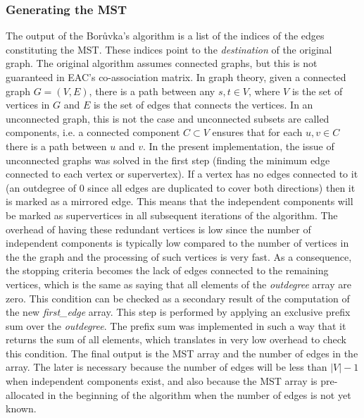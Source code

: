 \subsubsection{Generating the MST}
The output of the Borůvka's algorithm is a list of the indices of the edges constituting the MST. 
These indices point to the \emph{destination} of the original graph. 
The original algorithm \cite{Sousa2015} assumes connected graphs, but this is not guaranteed in EAC's co-association matrix.
In graph theory, given a connected graph $G = (V,E)$, there is a path between any $s,t \in V$, where $V$ is the set of vertices in $G$ and $E$ is the set of edges that connects the vertices.
In an unconnected graph, this is not the case and unconnected subsets are called components, i.e. a connected component $C \subset V$ ensures that for each $u,v \in C$ there is a path between $u$ and $v$.
In the present implementation, the issue of unconnected graphs was solved in the first step (finding the minimum edge connected to each vertex or supervertex). 
If a vertex has no edges connected to it (an outdegree of 0 since all edges are duplicated to cover both directions) then it is marked as a mirrored edge. 
This means that the independent components will be marked as supervertices in all subsequent iterations of the algorithm. 
The overhead of having these redundant vertices is low since the number of independent components is typically low compared to the number of vertices in the the graph and the processing of such vertices is very fast.
As a consequence, the stopping criteria becomes the lack of edges connected to the remaining vertices, which is the same as saying that all elements of the \emph{outdegree} array are zero. 
This condition can be checked as a secondary result of the computation of the new \emph{first\_edge} array. 
This step is performed by applying an exclusive prefix sum over the \emph{outdegree}. 
The prefix sum was implemented in such a way that it returns the sum of all elements, which translates in very low overhead to check this condition.
The final output is the MST array and the number of edges in the array. 
The later is necessary because the number of edges will be less than $|V|-1$ when independent components exist, and also because the MST array is pre-allocated in the beginning of the algorithm when the number of edges is not yet known.

